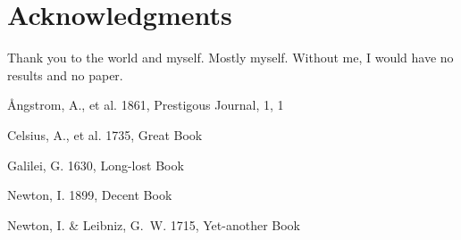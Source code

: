 \documentclass{cs19proc}
\begin{document}
\section*{Acknowledgments}
{Thank you to the world and myself. Mostly myself. Without me, I would have no results and no paper.}

\begin{thebibliography}{5}
\setlength{\itemsep}{0mm}
\small

 \r{A}ngstrom, A., et al. 1861, Prestigous Journal, 1, 1

 Celsius, A., et al. 1735, Great Book

 Galilei, G. 1630, Long-lost Book

 Newton, I. 1899, Decent Book

 Newton, I. \& Leibniz, G.~W. 1715, Yet-another Book

\end{thebibliography}
\end{document}
